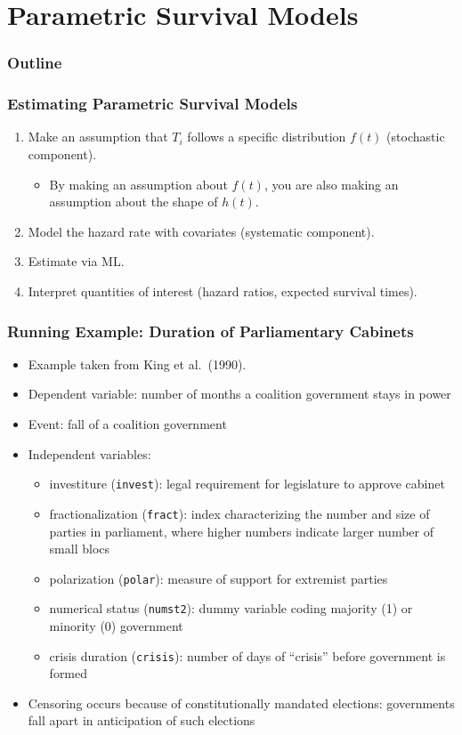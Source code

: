 \documentclass[handout]{beamer}
\begin{document}
\section{Parametric Survival Models}

\begin{frame}
\frametitle{Outline}
\tableofcontents[currentsection]
\end{frame}

\begin{frame}
\frametitle{Estimating Parametric Survival Models}
\pause
\begin{enumerate}
\item Make an assumption that $T_i$ follows a specific distribution
$f(t)$ (stochastic component).
\begin{itemize}
\pause
\item By making an assumption about $f(t)$, you are also making an
assumption about the shape of $h(t)$.
\end{itemize} 
\pause
\item Model the hazard rate with covariates (systematic component).
\pause
\item Estimate via ML.
\pause
\item Interpret quantities of interest (hazard ratios, expected
survival times).
\end{enumerate}
\end{frame}

\begin{frame}
\frametitle{Running Example: Duration of Parliamentary Cabinets}
\pause
\begin{itemize}
\item Example taken from King et al.\ (1990).
\pause
\item Dependent variable: number of months a coalition government
stays in power
\pause
\item Event: fall of a coalition government
\pause
\item Independent variables: 
\pause
\begin{itemize}
\item investiture ({\tt invest}): legal requirement for
legislature to approve cabinet
\pause
\item fractionalization ({\tt fract}): index characterizing the number
and size of parties in parliament, where higher numbers indicate
larger number of small blocs
\pause
\item polarization ({\tt polar}): measure of support for extremist parties
\pause
\item numerical status ({\tt numst2}): dummy variable coding majority
(1) or minority (0) government
\pause
\item crisis duration ({\tt crisis}): number of days of ``crisis''
before government is formed
\end{itemize}
\pause
\item Censoring occurs because of constitutionally mandated elections:
governments fall apart in anticipation of such elections
\end{itemize}
\end{frame}
\end{document}
